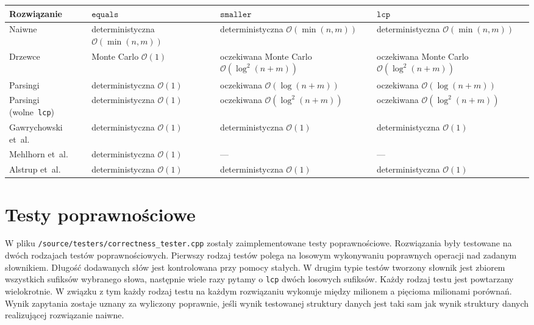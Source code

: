 \documentclass[declaration,shortabstract]{iithesis}
\theoremstyle{definition} \newtheorem{definition}{Definicja}[chapter]
\theoremstyle{plain} \newtheorem{remark}[definition]{Obserwacja}
\theoremstyle{plain} \newtheorem{theorem}[definition]{Twierdzenie}
\theoremstyle{plain} \newtheorem{example}{Przykład}[definition]
\theoremstyle{plain} \newtheorem{lemma}[definition]{Lemat}
\begin{document}
\begin{center}
    \begin{tabular}{ | m{3.5cm} | >{\centering\arraybackslash}m{2.8cm} | >{\centering\arraybackslash}m{2.8cm} | >{\centering\arraybackslash}m{2.8cm} | }
        \hline 
        Rozwiązanie & $\texttt{equals}$ & $\texttt{smaller}$ & $\texttt{lcp}$ \\
        \hline
        Naiwne & deterministyczna $\mathcal{O}(\min(n, m))$ & deterministyczna $\mathcal{O}(\min(n, m))$ & deterministyczna $\mathcal{O}(\min(n, m))$ \\
        \hline
        Drzewce & Monte Carlo $\mathcal{O}(1)$ & oczekiwana Monte Carlo $\mathcal{O}(\log^2(n + m))$ & oczekiwana Monte Carlo $\mathcal{O}(\log^2(n + m))$ \\
        \hline
        Parsingi & deterministyczna $\mathcal{O}(1)$ & oczekiwana $\mathcal{O}(\log(n + m))$ & oczekiwana $\mathcal{O}(\log(n + m))$ \\
        \hline
        Parsingi (wolne~\texttt{lcp}) & deterministyczna $\mathcal{O}(1)$ & oczekiwana $\mathcal{O}(\log^2(n + m))$ & oczekiwana $\mathcal{O}(\log^2(n + m))$ \\
        \hline
        Gawrychowski et~al.~\cite{gawrychowski} & deterministyczna $\mathcal{O}(1)$ & deterministyczna $\mathcal{O}(1)$ & deterministyczna $\mathcal{O}(1)$ \\
        \hline
        Mehlhorn et~al.~\cite{mehlhorn} & deterministyczna $\mathcal{O}(1)$ & --- & ---\\
        \hline
        Alstrup et~al.~\cite{alstrup} & deterministyczna $\mathcal{O}(1)$ & deterministyczna $\mathcal{O}(1)$ & deterministyczna $\mathcal{O}(1)$ \\
        \hline
    \end{tabular}
\end{center}

\section{Testy poprawnościowe}

W pliku \texttt{/source/testers/correctness\_tester.cpp} zostały zaimplementowane testy poprawnościowe. Rozwiązania były testowane na dwóch rodzajach testów poprawnościowych. Pierwszy rodzaj testów polega na losowym wykonywaniu poprawnych operacji nad zadanym słownikiem. Długość dodawanych słów jest kontrolowana przy pomocy stałych. W drugim typie testów tworzony słownik jest zbiorem wszystkich sufiksów wybranego słowa, następnie wiele razy pytamy o \texttt{lcp} dwóch losowych sufiksów. Każdy rodzaj testu jest powtarzany wielokrotnie. W związku z tym każdy rodzaj testu na każdym rozwiązaniu wykonuje między milionem a pięcioma milionami porównań. Wynik zapytania zostaje uznany za wyliczony poprawnie, jeśli wynik testowanej struktury danych jest taki sam jak wynik struktury danych realizującej rozwiązanie naiwne.
\end{document}
